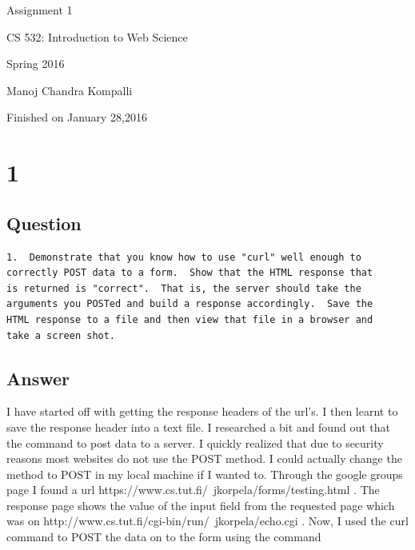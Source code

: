 \documentclass[letterpaper,11pt]{article}
\begin{document}
\begin{titlepage}

\begin{center}

\Huge{Assignment 1}

\Large{CS 532:  Introduction to Web Science}

\Large{Spring 2016}

\Large{Manoj Chandra Kompalli}

\Large Finished on January 28,2016

\end{center}

\end{titlepage}

\newpage
\section*{1}

\subsection*{Question}

\begin{verbatim}
1.  Demonstrate that you know how to use "curl" well enough to
correctly POST data to a form.  Show that the HTML response that
is returned is "correct".  That is, the server should take the
arguments you POSTed and build a response accordingly.  Save the
HTML response to a file and then view that file in a browser and
take a screen shot.
\end{verbatim}


\subsection*{Answer}

I have started off with getting the response headers of the url’s. I then learnt to save the response header into a text file. I researched a bit and found out that the command to post data to a server. I quickly realized that due to security reasons most websites do not use the POST method. I could actually change the method to POST in my local machine if I wanted to.  Through the google groups page I found a url  https://www.cs.tut.fi/~jkorpela/forms/testing.html  . 
The response page shows the value of the input field from the requested page which was on http://www.cs.tut.fi/cgi-bin/run/~jkorpela/echo.cgi . Now, I used the curl command to POST the data on to the form using the command
\end{document}
